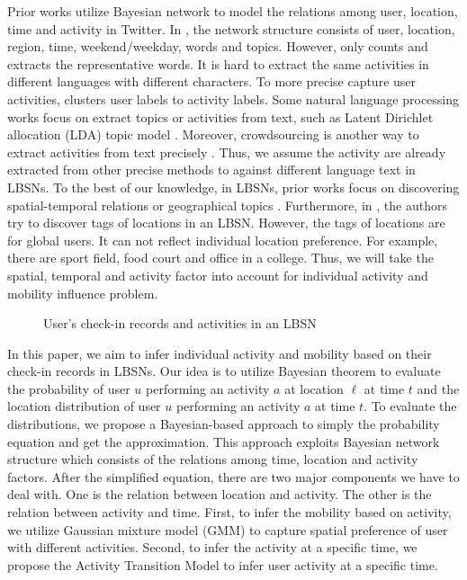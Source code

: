 Prior works \cite{13_KDD_Yuan} utilize Bayesian network to model the relations among user, location, time and activity in Twitter. In \cite{13_KDD_Yuan}, the network structure consists of user, location, region, time, weekend/weekday, words and topics. However, \cite{13_KDD_Yuan} only counts and extracts the representative words. It is hard to extract the same activities in different languages with different characters. To more precise capture user activities, \cite{10_AAAI_Peebles} clusters user labels to activity labels. Some natural language processing works focus on extract topics or activities from text, such as Latent Dirichlet allocation (LDA) topic model \cite{10_WSDM_Sizov}. Moreover, crowdsourcing is another way to extract activities from text precisely \cite{13_MUM_Zhu}. Thus, we assume the activity are already extracted from other precise methods to against different language text in LBSNs. To the best of our knowledge, in LBSNs, prior works focus on discovering spatial-temporal relations \cite{11_ICWSM_Noulas}\cite{11_KDD_Cho}\cite{11_SIGIR_Ye} or geographical topics \cite{12_WWW_Hong}\cite{10_WWW_Zheng}. Furthermore, in \cite{11_KDD_Ye}, the authors try to discover tags of locations in an LBSN. However, the tags of locations are for global users. It can not reflect individual location preference. For example, there are sport field, food court and office in a college. Thus, we will take the spatial, temporal and activity factor into account for individual activity and mobility influence problem.

\begin{figure}[t]
\centering
{}
\caption{User's check-in records and activities in an LBSN}
\label{fig:problem}
\end{figure}


In this paper, we aim to infer individual activity and mobility based on their check-in records in LBSNs. Our idea is to utilize Bayesian theorem \cite{11_Book_Han} to evaluate the probability of user $u$ performing an activity $a$ at location $\ell$ at time $t$ and the location distribution of user $u$ performing an activity $a$ at time $t$. To evaluate the distributions, we propose a Bayesian-based approach to simply the probability equation and get the approximation. This approach exploits Bayesian network structure which consists of the relations among time, location and activity factors. After the simplified equation, there are two major components we have to deal with. One is the relation between location and activity. The other is the relation between activity and time. First, to infer the mobility based on activity, we utilize Gaussian mixture model (GMM) to capture spatial preference of user with different activities. Second, to infer the activity at a specific time, we propose the Activity Transition Model to infer user activity at a specific time.


